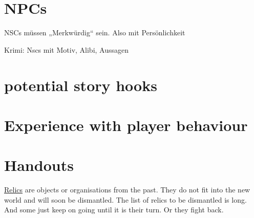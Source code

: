 \section{NPCs}

NSCs müssen „Merkwürdig“ sein. Also mit Persönlichkeit

Krimi: Nscs mit Motiv, Alibi, Aussagen


\section{potential story hooks}

\section{Experience with player behaviour}

\section{Handouts}



\begin{sidebarBox}[title=Relics]
\hyperref[sec:Relic]{Relics} are objects or organisations from the past. They do not fit into the new world and will soon be dismantled. The list of relics to be dismantled is long. And some just keep on going until it is their turn. Or they fight back.
\end{sidebarBox}




\label{ch:Label name}


